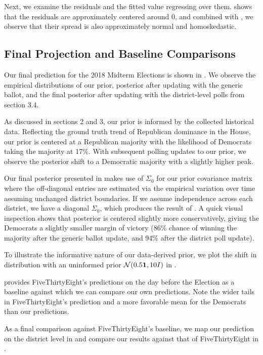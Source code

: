 \documentclass[11pt]{article}
\begin{document}
Next, we examine the residuals and the fitted value regressing over them.  shows that the residuals are approximately centered around 0, and combined with , we observe that their spread is also approximately normal and homoskedastic.

\subsection{Final Projection and Baseline Comparisons}
Our final prediction for the 2018 Midterm Elections is shown in . We observe the empirical distributions of our prior, posterior after updating with the generic ballot, and the final posterior after updating with the district-level polls from section 3.4.

As discussed in sections 2 and 3, our prior is informed by the collected historical data. Reflecting the ground truth trend of Republican dominance in the House, our prior is centered at a Republican majority with the likelihood of Democrats taking the majority at 17\%. With subsequent polling updates to our prior, we observe the posterior shift to a Democratic majority with a slightly higher peak. 

Our final posterior presented in  makes use of $\Sigma_0$ for our prior covariance matrix where the off-diagonal entries are estimated via the empirical variation over time assuming unchanged district boundaries. If we assume independence across each district, we have a diagonal $\Sigma_0$, which produces the result of . A quick visual inspection shows that posterior is centered slightly more conservatively, giving the Democrats a slightly smaller margin of victory (86\% chance of winning the majority after the generic ballot update, and 94\% after the district poll update).

To illustrate the informative nature of our data-derived prior, we plot the shift in distribution with an uninformed prior $\mathcal{N}(0.5\bm{1}, 10I)$ in .

 provides FiveThirtyEight's predictions on the day before the Election as a baseline against which we can compare our own predictions. Note the wider tails in FiveThirtyEight's prediction and a more favorable mean for the Democrats than our predictions.

As a final comparison against FiveThirtyEight's baseline, we map our prediction on the district level in  and compare our results against that of FiveThirtyEight in .
\end{document}
